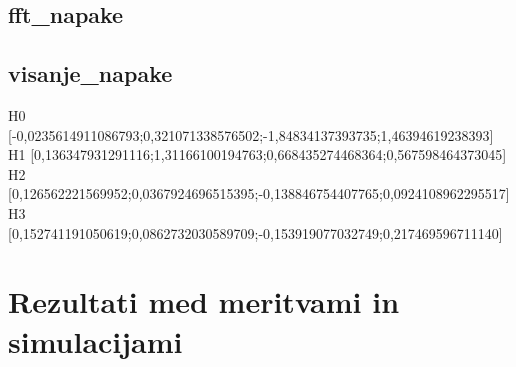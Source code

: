 \subsection{fft\_napake}
\subsection{visanje\_napake}

H0	[-0,0235614911086793;0,321071338576502;-1,84834137393735;1,46394619238393]
H1	[0,136347931291116;1,31166100194763;0,668435274468364;0,567598464373045]
H2	[0,126562221569952;0,0367924696515395;-0,138846754407765;0,0924108962295517]
H3	[0,152741191050619;0,0862732030589709;-0,153919077032749;0,217469596711140]

\section{Rezultati med meritvami in simulacijami}